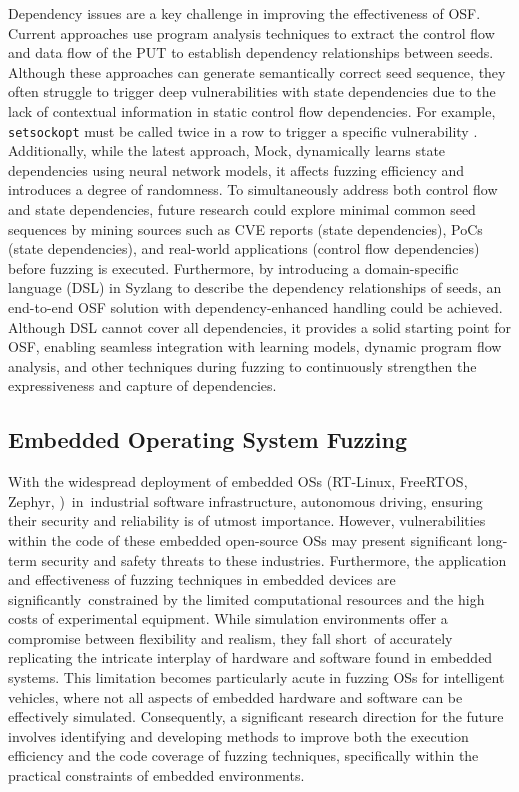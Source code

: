 Dependency issues are a key challenge in improving the effectiveness of OSF. Current approaches use program analysis techniques to extract the control flow and data flow of the PUT to establish dependency relationships between seeds. Although these approaches can generate semantically correct seed sequence, they often struggle to trigger deep vulnerabilities with state dependencies due to the lack of contextual information in static control flow dependencies. For example, \texttt{setsockopt} must be called twice in a row to trigger a specific vulnerability \cite{Xu2024MOCKOK}. Additionally, while the latest approach, Mock, dynamically learns state dependencies using neural network models, it affects fuzzing efficiency and introduces a degree of randomness. To simultaneously address both control flow and state dependencies, future research could explore minimal common seed sequences by mining sources such as CVE reports (state dependencies), PoCs (state dependencies), and real-world applications (control flow dependencies) before fuzzing is executed. Furthermore, by introducing a domain-specific language (DSL) in Syzlang to describe the dependency relationships of seeds, an end-to-end OSF solution with dependency-enhanced handling could be achieved. Although DSL cannot cover all dependencies, it provides a solid starting point for OSF, enabling seamless integration with learning models, dynamic program flow analysis, and other techniques during fuzzing to continuously strengthen the expressiveness and capture of dependencies.

\subsection{Embedded Operating System Fuzzing}

With the widespread deployment of embedded OSs (\eg RT-Linux, FreeRTOS, Zephyr, \etc)~in~industrial software infrastructure, \eg autonomous driving, ensuring their security and reliability is of utmost importance. However, vulnerabilities within the code of these embedded open-source OSs may present significant long-term security and safety threats to these industries. Furthermore, the application and effectiveness of fuzzing techniques in embedded devices are significantly~constrained by the limited computational resources and the high costs of experimental equipment. While simulation environments offer a compromise between flexibility and realism, they fall short~of accurately replicating the intricate interplay of hardware and software found in embedded systems. This limitation becomes particularly acute in fuzzing OSs for intelligent vehicles, where not all aspects of embedded hardware and software can be effectively simulated. Consequently, a significant research direction for the future involves identifying and developing methods to improve both the execution efficiency and the code coverage of fuzzing techniques, specifically within the practical constraints of embedded environments.

